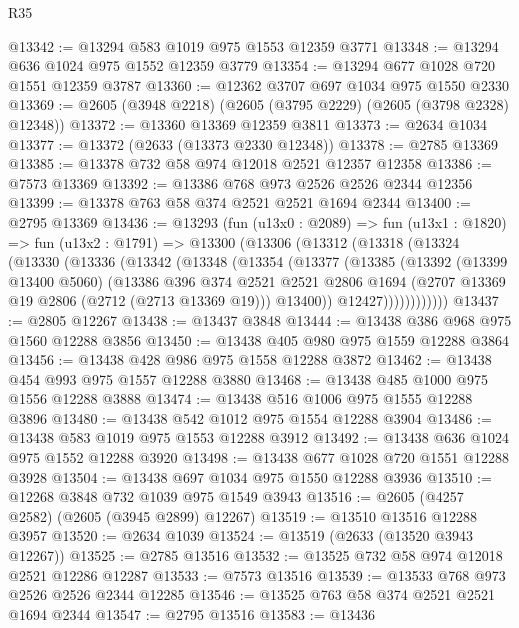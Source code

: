 \begin{lexlean}{R35}
\begin{coremodule}
@13342 := @13294 @583 @1019 @975 @1553 @12359 @3771
@13348 := @13294 @636 @1024 @975 @1552 @12359 @3779
@13354 := @13294 @677 @1028 @720 @1551 @12359 @3787
@13360 := @12362 @3707 @697 @1034 @975 @1550 @2330
@13369 := @2605 (@3948 @2218) (@2605 (@3795 @2229) (@2605 (@3798 @2328) @12348))
@13372 := @13360 @13369 @12359 @3811
@13373 := @2634 @1034
@13377 := @13372 (@2633 (@13373 @2330 @12348))
@13378 := @2785 @13369
@13385 := @13378 @732 @58 @974 @12018 @2521 @12357 @12358
@13386 := @7573 @13369
@13392 := @13386 @768 @973 @2526 @2526 @2344 @12356
@13399 := @13378 @763 @58 @374 @2521 @2521 @1694 @2344
@13400 := @2795 @13369
@13436 := @13293
    (fun (u13x0 : @2089) =>
    fun (u13x1 : @1820) =>
    fun (u13x2 : @1791) =>
    @13300
      (@13306
        (@13312
          (@13318
            (@13324
              (@13330
                (@13336
                  (@13342
                    (@13348
                      (@13354
                        (@13377
                          (@13385
                            (@13392
                              (@13399 @13400 @5060)
                              (@13386
                                @396
                                @374
                                @2521
                                @2521
                                @2806
                                @1694
                                (@2707 @13369 @19 @2806 (@2712 (@2713 @13369 @19)))
                                @13400))
                            @12427))))))))))))
@13437 := @2805 @12267
@13438 := @13437 @3848
@13444 := @13438 @386 @968 @975 @1560 @12288 @3856
@13450 := @13438 @405 @980 @975 @1559 @12288 @3864
@13456 := @13438 @428 @986 @975 @1558 @12288 @3872
@13462 := @13438 @454 @993 @975 @1557 @12288 @3880
@13468 := @13438 @485 @1000 @975 @1556 @12288 @3888
@13474 := @13438 @516 @1006 @975 @1555 @12288 @3896
@13480 := @13438 @542 @1012 @975 @1554 @12288 @3904
@13486 := @13438 @583 @1019 @975 @1553 @12288 @3912
@13492 := @13438 @636 @1024 @975 @1552 @12288 @3920
@13498 := @13438 @677 @1028 @720 @1551 @12288 @3928
@13504 := @13438 @697 @1034 @975 @1550 @12288 @3936
@13510 := @12268 @3848 @732 @1039 @975 @1549 @3943
@13516 := @2605 (@4257 @2582) (@2605 (@3945 @2899) @12267)
@13519 := @13510 @13516 @12288 @3957
@13520 := @2634 @1039
@13524 := @13519 (@2633 (@13520 @3943 @12267))
@13525 := @2785 @13516
@13532 := @13525 @732 @58 @974 @12018 @2521 @12286 @12287
@13533 := @7573 @13516
@13539 := @13533 @768 @973 @2526 @2526 @2344 @12285
@13546 := @13525 @763 @58 @374 @2521 @2521 @1694 @2344
@13547 := @2795 @13516
@13583 := @13436

\end{coremodule}
\end{lexlean}
